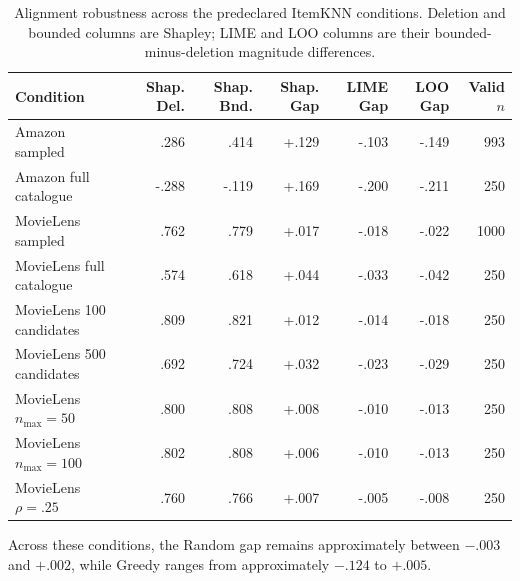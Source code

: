\begin{table}[ht]
\centering\scriptsize
\setlength{\tabcolsep}{1pt}
\caption{Alignment robustness across the predeclared ItemKNN conditions. Deletion and bounded columns are Shapley; LIME and LOO columns are their bounded-minus-deletion magnitude differences.}
\label{tab:app-alignment}
\setlength{\tabcolsep}{3pt}
\begin{tabular}{@{}p{}rrrrrr@{}}
\toprule
Condition & Shap. Del. & Shap. Bnd. & Shap. Gap & LIME Gap & LOO Gap & Valid $n$ \\
\midrule
Amazon sampled & .286 & .414 & +.129 & -.103 & -.149 & 993 \\
Amazon full catalogue & -.288 & -.119 & +.169 & -.200 & -.211 & 250 \\
MovieLens sampled & .762 & .779 & +.017 & -.018 & -.022 & 1000 \\
MovieLens full catalogue & .574 & .618 & +.044 & -.033 & -.042 & 250 \\
MovieLens 100 candidates & .809 & .821 & +.012 & -.014 & -.018 & 250 \\
MovieLens 500 candidates & .692 & .724 & +.032 & -.023 & -.029 & 250 \\
MovieLens $n_{\max}=50$ & .800 & .808 & +.008 & -.010 & -.013 & 250 \\
MovieLens $n_{\max}=100$ & .802 & .808 & +.006 & -.010 & -.013 & 250 \\
MovieLens $\rho=.25$ & .760 & .766 & +.007 & -.005 & -.008 & 250 \\
\bottomrule
\end{tabular}
\end{table}

\noindent Across these conditions, the Random gap remains approximately between $-.003$ and $+.002$, while Greedy ranges from approximately $-.124$ to $+.005$.

